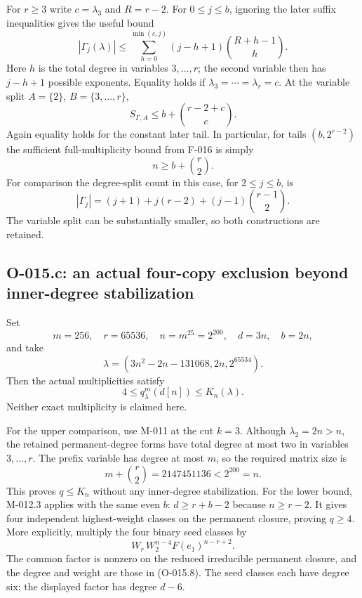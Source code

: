 For $r\geq3$ write $c=\lambda_3$ and $R=r-2$.
For $0\leq j\leq b$, ignoring the later suffix inequalities
gives the useful bound
\[
 |\Gamma_j(\lambda)|\leq
 \sum_{h=0}^{\min(c,j)}(j-h+1)\binom{R+h-1}{h}.
                                                               \tag{O-015.5}
\]
Here $h$ is the total degree in variables $3,\ldots,r$;
the second variable then has $j-h+1$ possible exponents.
Equality holds if $\lambda_3=\cdots=\lambda_r=c$.
At the variable split $A=\{2\}$, $B=\{3,\ldots,r\}$,
\[
                   S_{\Gamma,A}\leq
                          b+\binom{r-2+c}{c}.          \tag{O-015.6}
\]
Again equality holds for the constant later tail. In particular,
for tails $(b,2^{r-2})$ the sufficient full-multiplicity bound
from F-016 is simply
\[
                       n\geq b+\binom r2.             \tag{O-015.7}
\]
For comparison the degree-split count in this case, for $2\leq j\leq b$,
is
\[
              |\Gamma_j|=(j+1)+j(r-2)+(j-1)\binom{r-1}{2}.
\]
The variable split can be substantially smaller, so both
constructions are retained.

\subsection{O-015.c: an actual four-copy exclusion beyond inner-degree stabilization}

Set
\[
 m=256,\quad r=65536,\quad n=m^{25}=2^{200},\quad
 d=3n,\quad b=2n,
\]
and take
\[
           \lambda=(3n^2-2n-131068,2n,2^{65534}).       \tag{O-015.8}
\]
Then the actual multiplicities satisfy
\[
                         4\leq q^m_\lambda(d[n])
                                      \leq K_n(\lambda).        \tag{O-015.9}
\]
Neither exact multiplicity is claimed here.

For the upper comparison, use M-011 at the cut $k=3$.
Although $\lambda_2=2n>n$, the retained permanent-degree
forms have total degree at most two in variables $3,\ldots,r$.
The prefix variable has degree at most $m$, so the required
matrix size is
\[
               m+\binom r2=2147451136<2^{200}=n.
\]
This proves $q\leq K_n$ without any inner-degree stabilization.
For the lower bound, M-012.3 applies with the same even $b$:
$d\geq r+b-2$ because $n\geq r-2$. It gives four
independent highest-weight classes on the permanent closure,
proving $q\geq4$. More explicitly, multiply the four binary
seed classes by
\[
              W_r\,W_2^{n-4}F(e_1)^{n-r+2}.
\]
The common factor is nonzero on the reduced irreducible
permanent closure, and the degree and weight are those in
(O-015.8). The seed classes each have degree six; the
displayed factor has degree $d-6$.

